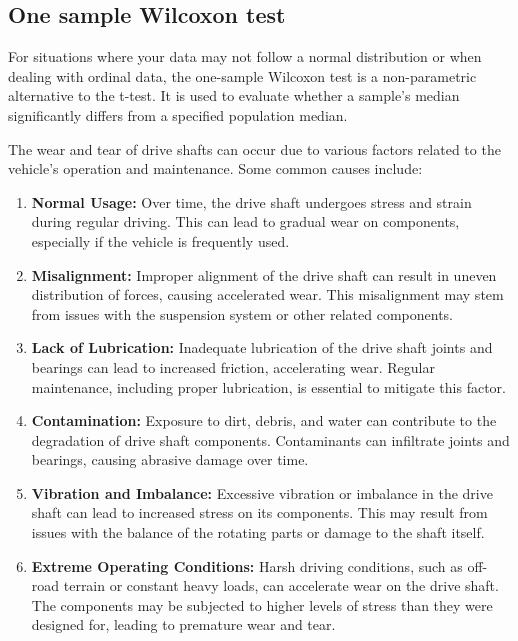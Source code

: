 \documentclass[
  a4paper,
]{scrbook}
\begin{document}
\subsection{One sample Wilcoxon test}\label{one-sample-wilcoxon-test}

For situations where your data may not follow a normal distribution or
when dealing with ordinal data, the one-sample Wilcoxon test is a
non-parametric alternative to the t-test. It is used to evaluate whether
a sample's median significantly differs from a specified population
median.

The wear and tear of drive shafts can occur due to various factors
related to the vehicle's operation and maintenance. Some common causes
include:

\begin{enumerate}
\def\labelenumi{\arabic{enumi}.}
\item
  \textbf{Normal Usage:} Over time, the drive shaft undergoes stress and
  strain during regular driving. This can lead to gradual wear on
  components, especially if the vehicle is frequently used.
\item
  \textbf{Misalignment:} Improper alignment of the drive shaft can
  result in uneven distribution of forces, causing accelerated wear.
  This misalignment may stem from issues with the suspension system or
  other related components.
\item
  \textbf{Lack of Lubrication:} Inadequate lubrication of the drive
  shaft joints and bearings can lead to increased friction, accelerating
  wear. Regular maintenance, including proper lubrication, is essential
  to mitigate this factor.
\item
  \textbf{Contamination:} Exposure to dirt, debris, and water can
  contribute to the degradation of drive shaft components. Contaminants
  can infiltrate joints and bearings, causing abrasive damage over time.
\item
  \textbf{Vibration and Imbalance:} Excessive vibration or imbalance in
  the drive shaft can lead to increased stress on its components. This
  may result from issues with the balance of the rotating parts or
  damage to the shaft itself.
\item
  \textbf{Extreme Operating Conditions:} Harsh driving conditions, such
  as off-road terrain or constant heavy loads, can accelerate wear on
  the drive shaft. The components may be subjected to higher levels of
  stress than they were designed for, leading to premature wear and
  tear.
\end{enumerate}
\end{document}
